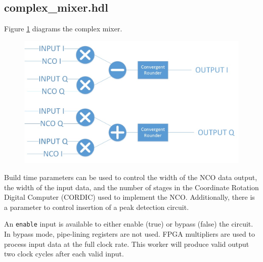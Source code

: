\documentclass{article}
\def\comp{complex\_mixer}
\begin{document}
\subsection*{\comp.hdl}
\begin{flushleft}
	Figure \ref{fig:complex_mixer} diagrams the complex mixer.\medskip

	\begin{figure}[h]
		\centering\captionsetup{type=figure}\includegraphics[scale=0.4]{complex_mixer_block_diagram}
		\label{fig:complex_mixer}
	\end{figure}
	Build time parameters can be used to control the width of the NCO data output, the width of the input data, and the number of stages in the Coordinate Rotation Digital Computer (CORDIC) used to implement the NCO. Additionally, there is a parameter to control insertion of a peak detection circuit.\medskip

	An \verb+enable+ input is available to either enable (true) or bypass (false) the circuit. In bypass mode, pipe-lining registers are not used. FPGA multipliers are used to process input data at the full clock rate. This worker will produce valid output two clock cycles after each valid input.
\end{flushleft}
\end{document}
